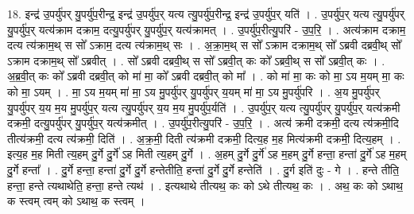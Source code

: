 \documentclass[17pt]{extarticle}
\begin{document}
18. इन्द्र॑ उ॒पर्यु॑पर् यु॒पर्यु॑प॒रीन्द्र॒ इन्द्र॑ उ॒पर्यु॑प॒र् यत्य त्यु॒पर्यु॑प॒रीन्द्र॒ इन्द्र॑ उ॒पर्यु॑प॒र् यति॑ । . उ॒पर्यु॑प॒र् यत्य त्यु॒पर्यु॑पर् यु॒पर्यु॑प॒र् यत्य॑क्राम दक्राम॒ दत्यु॒पर्यु॑पर् यु॒पर्यु॑प॒र् यत्य॑क्रामत् । . उ॒पर्यु॑प॒रीत्यु॒परि॑ - उ॒प॒रि॒ । . अत्य॑क्राम दक्राम॒ दत्य त्य॑क्राम॒थ् स सो᳚ ऽक्राम॒ दत्य त्य॑क्राम॒थ् सः । . अ॒क्रा॒म॒थ् स सो᳚ ऽक्राम दक्राम॒थ् सो᳚ ऽब्रवी दब्रवी॒थ् सो᳚ ऽक्राम दक्राम॒थ् सो᳚ ऽब्रवीत् । . सो᳚ ऽब्रवी दब्रवी॒थ् स सो᳚ ऽब्रवी॒त् कः को᳚ ऽब्रवी॒थ् स सो᳚ ऽब्रवी॒त् कः । . अ॒ब्र॒वी॒त् कः को᳚ ऽब्रवी दब्रवी॒त् को मा॑ मा॒ को᳚ ऽब्रवी दब्रवी॒त् को मा᳚ । . को मा॑ मा॒ कः को मा॒ ऽय म॒यम् मा॒ कः को मा॒ ऽयम् । . मा॒ ऽय म॒यम् मा॑ मा॒ ऽय मु॒पर्यु॑पर् यु॒पर्यु॑पर् य॒यम् मा॑ मा॒ ऽय मु॒पर्यु॑परि । . अ॒य मु॒पर्यु॑पर् यु॒पर्यु॑पर् य॒य म॒य मु॒पर्यु॑प॒र् यत्य त्यु॒पर्यु॑पर् य॒य म॒य मु॒पर्यु॑प॒र्यति॑ । . उ॒पर्यु॑प॒र् यत्य त्यु॒पर्यु॑पर् यु॒पर्यु॑प॒र् यत्य॑क्रमी दक्रमी॒ दत्यु॒पर्यु॑पर् यु॒पर्यु॑प॒र् यत्य॑क्रमीत् । . उ॒पर्यु॑प॒रीत्यु॒परि॑ - उ॒प॒रि॒ । . अत्य॑ क्रमी दक्रमी॒ दत्य त्य॑क्रमी॒दि तीत्य॑क्रमी॒ दत्य त्य॑क्रमी॒ दिति॑ । . अ॒क्र॒मी॒ दिती त्य॑क्रमी दक्रमी॒ दित्य॒ह म॒ह मित्य॑क्रमी दक्रमी॒ दित्य॒हम् । . इत्य॒ह म॒ह मिती त्य॒हम् दु॒र्गे दु॒र्गे॑ ऽह मिती त्य॒हम् दु॒र्गे । . अ॒हम् दु॒र्गे दु॒र्गे॑ ऽह म॒हम् दु॒र्गे हन्ता॒ हन्ता॑ दु॒र्गे॑ ऽह म॒हम् दु॒र्गे हन्ता᳚ । . दु॒र्गे हन्ता॒ हन्ता॑ दु॒र्गे दु॒र्गे हन्तेतीति॒ हन्ता॑ दु॒र्गे दु॒र्गे हन्तेति॑ । . दु॒र्ग इति॑ दुः - गे । . हन्ते तीति॒ हन्ता॒ हन्ते त्यथाथेति॒ हन्ता॒ हन्ते त्यथ॑ । . इत्यथाथे तीत्यथ॒ कः को ऽथे तीत्यथ॒ कः । . अथ॒ कः को ऽथाथ॒ क स्त्वम् त्वम् को ऽथाथ॒ क स्त्वम् । \newline
\end{document}
